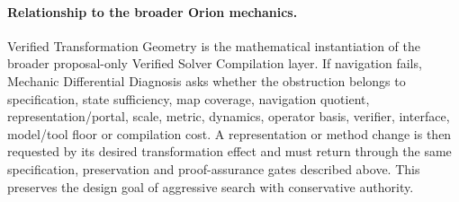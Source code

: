 \paragraph{Relationship to the broader Orion mechanics.}
Verified Transformation Geometry is the mathematical instantiation of the broader proposal-only Verified Solver Compilation layer. If navigation fails, Mechanic Differential Diagnosis asks whether the obstruction belongs to specification, state sufficiency, map coverage, navigation quotient, representation/portal, scale, metric, dynamics, operator basis, verifier, interface, model/tool floor or compilation cost. A representation or method change is then requested by its desired transformation effect and must return through the same specification, preservation and proof-assurance gates described above. This preserves the design goal of aggressive search with conservative authority.
